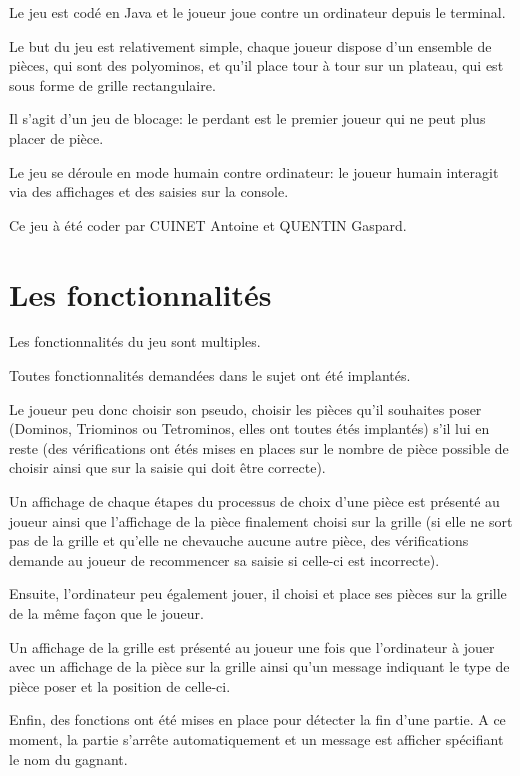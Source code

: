 \documentclass[a4paper, titlepage, french]{report}
\begin{document}
\bigskip

Le jeu est codé en Java et le joueur joue contre un ordinateur depuis le terminal.

\bigskip

Le but du jeu est relativement simple, chaque joueur dispose d'un ensemble de pièces, qui sont des polyominos, et qu'il place
tour à tour sur un plateau, qui est sous forme de grille rectangulaire. 

Il s'agit d'un jeu de blocage: le perdant est le premier
joueur qui ne peut plus placer de pièce.

Le jeu se déroule en mode
humain contre ordinateur: le joueur humain interagit via des affichages et des saisies sur la console.

\bigskip

Ce jeu à été coder par CUINET Antoine et QUENTIN Gaspard.



\newpage

\chapter{Les fonctionnalités}

Les fonctionnalités du jeu sont multiples.
\bigskip


Toutes fonctionnalités demandées dans le sujet ont été implantés.
\bigskip

Le joueur peu donc choisir son pseudo, choisir les pièces qu'il souhaites poser (Dominos, Triominos ou Tetrominos, elles ont toutes étés implantés) s'il lui en reste (des vérifications ont étés mises en places sur le nombre de pièce possible de choisir ainsi que sur la saisie qui doit être correcte).

Un affichage de chaque étapes du processus de choix d'une pièce est présenté au joueur ainsi que l'affichage de la pièce finalement choisi sur la grille (si elle ne sort pas de la grille et qu'elle ne chevauche aucune autre pièce, des vérifications demande au joueur de recommencer sa saisie si celle-ci est incorrecte).
\bigskip

Ensuite, l'ordinateur peu également jouer, il choisi et place ses pièces sur la grille de la même façon que le joueur.

Un affichage de la grille est présenté au joueur une fois que l'ordinateur à jouer avec un affichage de la pièce sur la grille ainsi qu'un message indiquant le type de pièce poser et la position de celle-ci.
\bigskip

Enfin, des fonctions ont été mises en place pour détecter la fin d'une partie. A ce moment, la partie s'arrête automatiquement et un message est afficher spécifiant le nom du gagnant.
\end{document}
